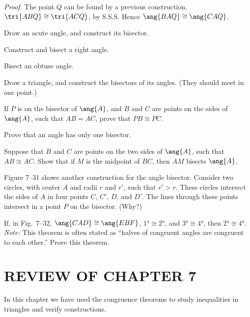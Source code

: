 \documentclass[11pt]{book}
\theoremstyle{bkplain}
\theoremstyle{XIplainnote}
\theoremstyle{bkplain}
\theoremstyle{bkplain}
\begin{document}
\noindent\emph{Proof.}\quad
The point $Q$ can be found by a previous construction.
$\tri{ABQ} \cong \tri{ACQ}$, by S.S.S. Hence $\ang{BAQ} \cong \ang{CAQ}$.

\FIGVIITHIRTY

\begin{exercisecols}
\begin{exlist}
\item Draw an acute angle, and construct its bisector.
\item Construct and bisect a right angle.
\item Bisect an obtuse angle.
\item Draw a triangle, and construct the bisectors of its angles. (They should
  meet in one point.)
\item If $P$ is on the bisector of $\ang{A}$, and $B$ and $C$ are points on the
  sides of $\ang{A}$, such that $AB = AC$, prove that $PB \cong PC$.
\item Prove that an angle has only one bisector.
\item Suppose that $B$ and $C$ are points on the two sides of $\ang{A}$, such
  that $AB \cong AC$. Show that if $M$ is the midpoint of $BC$, then $AM$
  bisects $\ang{A}$.
\item[\stex 8.] Figure 7--31 shows another construction for the angle bisector.
  Consider two circles, with center $A$ and radii $r$ and $r'$, such that
  $r' > r$. These circles intersect the sides of $A$ in four points $C$, $C'$,
  $D$, and $D'$. The lines through these points intersect in a point $P$ on the
  bisector. (Why?)
\exfig{\FIGVIITHIRTYONE}
\item[\stex 9.] If, in Fig.~7--32, $\ang{CAD} \cong \ang{EBF}$,
  $\ang{1} \cong \ang{2}$, and $\ang{3} \cong \ang{4}$, then
  $\ang{2} \cong \ang{4}$. \emph{Note:} This theorem is often stated as
  ``halves of congruent angles are congruent to each other.'' Prove this
  theorem.
\exfig{\FIGVIITHIRTYTWO}
\end{exlist}
\end{exercisecols}

\section*{REVIEW OF CHAPTER 7}

In this chapter we have used the congruence theorems to study inequalities in
triangles and verify constructions.
\end{document}
